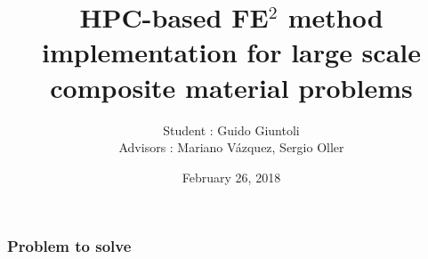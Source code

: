 \documentclass[usenames,dvipsnames]{beamer}
\title[Short title]{HPC-based FE$^2$ method implementation for large scale composite material problems}
\author{Student : Guido Giuntoli \\ Advisors : Mariano V\'azquez, Sergio Oller} %
\institute[BSC-UPC] %
{
Barcelona Supercomputing Center\\Universitat Polit\`ecnica de Catalunya \\ %
\medskip
\textit{guido.giuntoli@bsc.es} %
}
\date{February 26, 2018} %
\begin{document}
\begin{frame}
\titlepage %
\end{frame}






\begin{frame}
\frametitle{Problem to solve}
\begin{figure}[!ht]
\resizebox{0.4\linewidth}{!}{}
\end{figure}
\end{frame}

\end{document}
